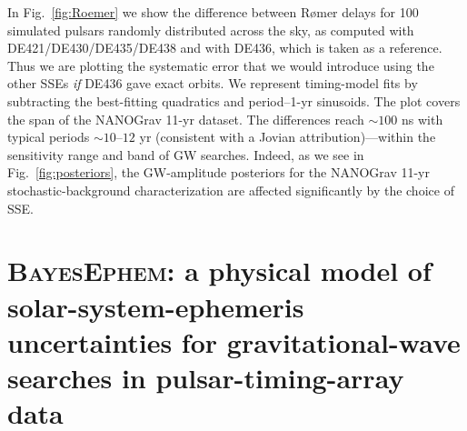 \documentclass[iop,apj,twocolappendix]{emulateapj}
\begin{document}
In Fig.\ \ref{fig:Roemer} we show the difference between R{\o}mer delays for 100 simulated pulsars randomly distributed across the sky, as computed with DE421/DE430/DE435/DE438 and with DE436, which is taken as a reference. Thus we are plotting the systematic error that we would introduce using the other SSEs \emph{if} DE436 gave exact orbits. We represent timing-model fits by subtracting the best-fitting quadratics and period--1-yr sinusoids. The plot covers the span of the NANOGrav 11-yr dataset.
The differences reach $\sim 100$ ns with typical periods $\sim 10$--$12$ yr (consistent with a Jovian attribution)---within the sensitivity range and band of GW searches. Indeed, as we see in Fig.\ \ref{fig:posteriors}, the GW-amplitude posteriors for the NANOGrav 11-yr stochastic-background characterization are affected significantly by the choice of SSE.

\section{\textsc{BayesEphem}: a physical model of solar-system-ephemeris uncertainties for gravitational-wave searches in pulsar-timing-array data}
\label{sec:physical}
\end{document}
